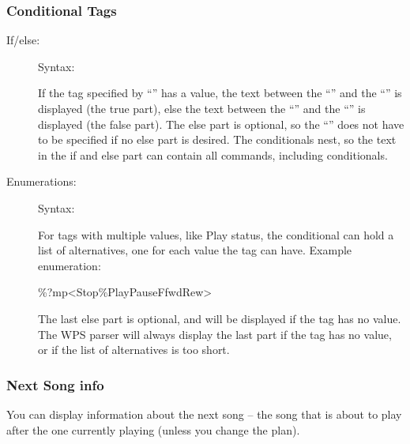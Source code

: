 
\subsubsection{Conditional Tags}

\begin{description}
\item[If/else: ]
Syntax: 

If the tag specified by ``'' has a value, the text between the 
``\config{{\textless}}'' and the ``\config{{\textbar}}'' is displayed (the true
part), else the text between the ``\config{{\textbar}}'' and the 
``\config{{\textgreater}}'' is displayed (the false part).
The else part is optional, so the ``\config{{\textbar}}'' does not have to be 
specified if no else part is desired. The conditionals nest, so the text in the
if and else part can contain all \config{\%} commands, including conditionals.

\item[Enumerations: ]
Syntax: 

For tags with multiple values, like Play status, the conditional can hold a 
list of alternatives, one for each value the tag can have.
Example enumeration: 
\begin{example}
     \%?mp{\textless}Stop{\textbar}\%Play{\textbar}Pause{\textbar}Ffwd{\textbar}Rew{\textgreater}
\end{example}

The last else part is optional, and will be displayed if the tag has no value. 
The WPS parser will always display the last part if the tag has no value, or if
the list of alternatives is too short.
\end{description}

\subsubsection{Next Song info}
You can display information about the next song -- the song that is
about to play after the one currently playing (unless you change the
plan).

